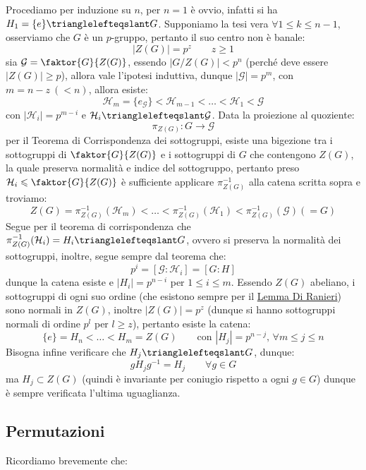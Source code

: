 \documentclass[11pt]{scrartcl}
\begin{document}
\begin{soln}
    Procediamo per induzione su $n$, per $n = 1$ è ovvio, infatti si ha $H_1 = \{e\} \trianglelefteqslant G$.
    Supponiamo la tesi vera $\forall 1 \leq k \leq n-1$, osserviamo che $G$ è un $p$-gruppo, pertanto il suo centro non è banale:
        \[ |Z(G)| = p^z \qquad z\geq 1
            \]
    sia $\mathcal{G} = \faktor{G}{Z(G)}$, essendo $|G/Z(G)| < p^n$ (perché deve essere $|Z(G)| \geq p$), allora vale l'ipotesi induttiva, dunque
    $|\mathcal{G}| = p^m$, con $m = n-z\ (<n)$, allora esiste:
        \[ \mathcal{H}_m = \{e_{\mathcal{G}}\} < \mathcal{H}_{m-1} < \ldots < \mathcal{H}_1 < \mathcal{G}
            \]
    con $|\mathcal{H}_i| = p^{m-i}$ e $\mathcal{H}_i \trianglelefteqslant \mathcal{G}$. Data la proiezione al quoziente:
        \[ \pi_{Z(G)} : G \longrightarrow \mathcal{G}
            \]
    per il Teorema di Corrispondenza dei sottogruppi, esiste una bigezione tra i sottogruppi di $\faktor{G}{Z(G)}$ e i sottogruppi di
    $G$ che contengono $Z(G)$, la quale preserva normalità e indice del sottogruppo, pertanto preso $\mathcal{H}_i \leqslant \faktor{G}{Z(G)}$ è sufficiente
    applicare $\pi_{Z(G)}^{-1}$ alla catena scritta sopra e troviamo:
        \[ Z(G) = \pi_{Z(G)}^{-1}(\mathcal{H}_{m}) < \ldots < \pi_{Z(G)}^{-1}(\mathcal{H}_{1}) < \pi_{Z(G)}^{-1}(\mathcal{G}) (= G)
            \]
    Segue per il teorema di corrispondenza che $\pi_{Z(G)}^{-1}(\mathcal{H}_i) = H_i \trianglelefteqslant G$, ovvero si preserva la normalità dei sottogruppi, inoltre,
    segue sempre dal teorema che:
        \[ p^i = [\mathcal{G} : \mathcal{H}_i] = [G : H]
            \]
    dunque la catena esiste  e $|H_i| = p^{n-i}$ per $1\leq i \leq m$. Essendo $Z(G)$ abeliano, i sottogruppi di ogni suo ordine (che esistono sempre
    per il \hyperref[davide]{Lemma Di Ranieri}) sono normali in $Z(G)$, inoltre $|Z(G)| = p^z$ (dunque si hanno sottogruppi normali di ordine $p^l$ per $l \geq z$), pertanto esiste la catena:
        \[ \{e\} = H_n < \ldots < H_m = Z(G)
        \qquad \text{con $|H_j| = p^{n-j}$, $\forall m \leq j \leq n$} 
            \]
    Bisogna infine verificare che $H_j \trianglelefteqslant G$, dunque:
        \[ gH_jg^{-1} = H_j \qquad \forall g \in G
            \]
    ma $H_j \subset Z(G)$ (quindi è invariante per coniugio rispetto a ogni $g \in G$) dunque è sempre verificata l'ultima uguaglianza.
\end{soln}

\newpage
\subsection{Permutazioni}
Ricordiamo brevemente che:
\end{document}
